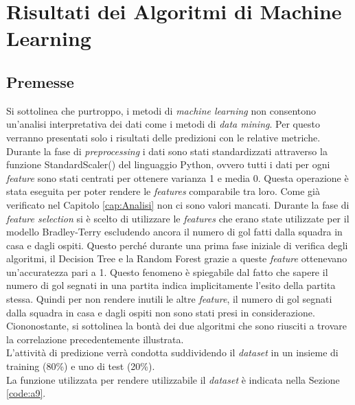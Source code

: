 \chapter{Risultati dei Algoritmi di Machine Learning}
\label{cap:RisML}

\section{Premesse}
Si sottolinea che purtroppo, i metodi di \emph{machine learning} non consentono un'analisi interpretativa dei dati come i metodi di \emph{data mining}. Per questo verranno presentati solo i risultati delle predizioni con le relative metriche.\\
Durante la fase di \emph{preprocessing} i dati sono stati standardizzati attraverso la funzione \textsf{StandardScaler()} del linguaggio Python, ovvero tutti i dati per ogni \emph{feature} sono stati centrati per ottenere varianza 1 e media 0. Questa operazione è stata eseguita per poter rendere le \emph{features} comparabile tra loro. Come già verificato nel Capitolo \ref{cap:Analisi} non ci sono valori mancati. Durante la fase di \emph{feature selection} si è scelto di utilizzare le \emph{features} che erano state utilizzate per il modello Bradley-Terry escludendo ancora il numero di gol fatti dalla squadra in casa e dagli ospiti. Questo perché durante una prima fase iniziale di verifica degli algoritmi, il Decision Tree e la Random Forest grazie a queste \emph{feature} ottenevano un’accuratezza pari a 1. Questo fenomeno è spiegabile dal fatto che sapere il numero di gol segnati in una partita indica implicitamente l'esito della partita stessa. Quindi per non rendere inutili le altre \emph{feature}, il numero di gol segnati dalla squadra in casa e dagli ospiti non sono stati presi in considerazione. Ciononostante, si sottolinea la bontà dei due algoritmi che sono riusciti a trovare la correlazione precedentemente illustrata. \\
L'attività di predizione verrà condotta suddividendo il \emph{dataset} in un insieme di training (80\%) e uno di test (20\%).\\
La funzione utilizzata per rendere utilizzabile il \emph{dataset} è indicata nella Sezione \ref{code:a9}.

